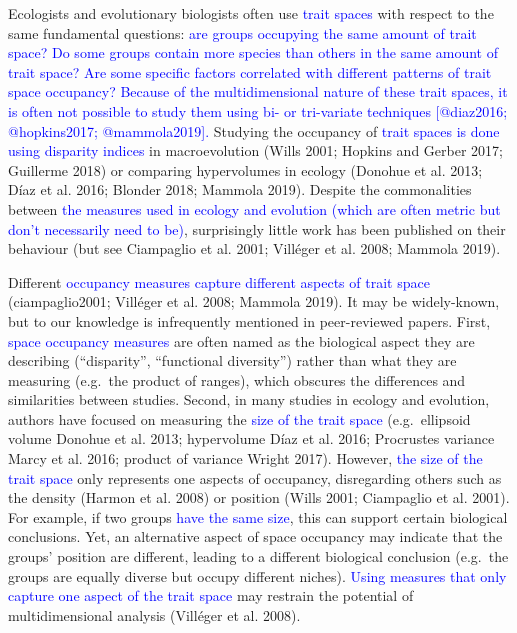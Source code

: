 \documentclass[]{article}
\begin{document}
\renewcommand\baselinestretch{1.6}\selectfont

Ecologists and evolutionary biologists often use
\textcolor{blue}{trait spaces} with respect to the same
fundamental questions:
\textcolor{blue}{are groups occupying the same amount of trait space?
Do some groups contain more species than others in the same amount of trait space?
Are some specific factors correlated with different patterns of trait space occupancy?
Because of the multidimensional nature of these trait spaces, it is often not possible to study them using bi- or tri-variate techniques [@diaz2016; @hopkins2017; @mammola2019].}
Studying the occupancy of
\textcolor{blue}{trait spaces is done using disparity indices}
in macroevolution (Wills 2001; Hopkins and Gerber 2017; Guillerme 2018)
or comparing hypervolumes in ecology (Donohue et al. 2013; Díaz et al.
2016; Blonder 2018; Mammola 2019). Despite the commonalities between
\textcolor{blue}{the measures used in ecology and evolution (which are often metric but don't necessarily need to be)},
surprisingly little work has been published on their behaviour (but see
Ciampaglio et al. 2001; Villéger et al. 2008; Mammola 2019).

Different
\textcolor{blue}{occupancy measures capture different aspects of  trait space}
(ciampaglio2001; Villéger et al. 2008; Mammola 2019). It may be
widely-known, but to our knowledge is infrequently mentioned in
peer-reviewed papers. First,
\textcolor{blue}{space occupancy measures} are often named
as the biological aspect they are describing (``disparity'',
``functional diversity'') rather than what they are measuring (e.g.~the
product of ranges), which obscures the differences and similarities
between studies. Second, in many studies in ecology and evolution,
authors have focused on measuring the
\textcolor{blue}{size of the trait space} (e.g.~ellipsoid
volume Donohue et al. 2013; hypervolume Díaz et al. 2016; Procrustes
variance Marcy et al. 2016; product of variance Wright 2017). However,
\textcolor{blue}{the size of the trait space} only
represents one aspects of occupancy, disregarding others such as the
density (Harmon et al. 2008) or position (Wills 2001; Ciampaglio et al.
2001). For example, if two groups
\textcolor{blue}{have the same size}, this can support
certain biological conclusions. Yet, an alternative aspect of space
occupancy may indicate that the groups' position are different, leading
to a different biological conclusion (e.g.~the groups are equally
diverse but occupy different niches).
\textcolor{blue}{Using measures that only capture one aspect of the trait space}
may restrain the potential of multidimensional analysis (Villéger et al.
2008).
\end{document}
